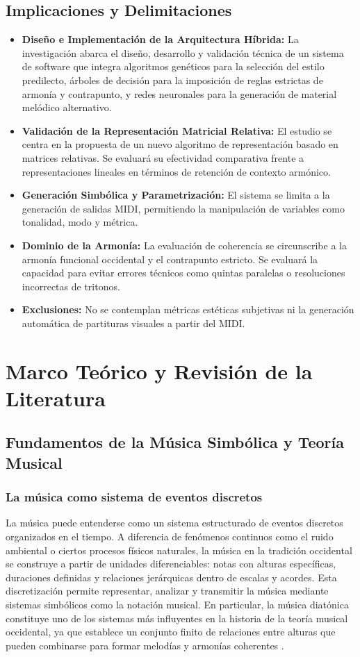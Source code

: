 \documentclass[12pt]{report}
\begin{document}
\section{Implicaciones y Delimitaciones}
\begin{itemize}
    \item \textbf{Diseño e Implementación de la Arquitectura Híbrida:} La investigación abarca el diseño, desarrollo y validación técnica de un sistema de software que integra algoritmos genéticos para la selección del estilo predilecto, árboles de decisión para la imposición de reglas estrictas de armonía y contrapunto, y redes neuronales para la generación de material melódico alternativo.
    \item \textbf{Validación de la Representación Matricial Relativa:} El estudio se centra en la propuesta de un nuevo algoritmo de representación basado en matrices relativas. Se evaluará su efectividad comparativa frente a representaciones lineales en términos de retención de contexto armónico.
    \item \textbf{Generación Simbólica y Parametrización:} El sistema se limita a la generación de salidas MIDI, permitiendo la manipulación de variables como tonalidad, modo y métrica.
    \item \textbf{Dominio de la Armonía:} La evaluación de coherencia se circunscribe a la armonía funcional occidental y el contrapunto estricto. Se evaluará la capacidad para evitar errores técnicos como quintas paralelas o resoluciones incorrectas de tritonos.
    \item \textbf{Exclusiones:} No se contemplan métricas estéticas subjetivas ni la generación automática de partituras visuales a partir del MIDI.
\end{itemize}

\chapter{Marco Teórico y Revisión de la Literatura}
\section{Fundamentos de la Música Simbólica y Teoría Musical}
\subsection{La música como sistema de eventos discretos}

La música puede entenderse como un sistema estructurado de eventos discretos organizados en el tiempo. A diferencia de fenómenos continuos como el ruido ambiental o ciertos procesos físicos naturales, la música en la tradición occidental se construye a partir de unidades diferenciables: notas con alturas específicas, duraciones definidas y relaciones jerárquicas dentro de escalas y acordes. Esta discretización permite representar, analizar y transmitir la música mediante sistemas simbólicos como la notación musical. En particular, la música diatónica constituye uno de los sistemas más influyentes en la historia de la teoría musical occidental, ya que establece un conjunto finito de relaciones entre alturas que pueden combinarse para formar melodías y armonías coherentes \cite{tymoczko2011}.
\end{document}
